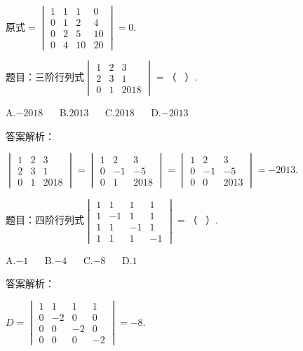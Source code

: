 $\mathrm{原式}=\begin{vmatrix}1&1&1&0\\0&1&2&4\\0&2&5&10\\0&4&10&20\end{vmatrix}=0.$



题目：$\mathrm{三阶行列式}\begin{vmatrix}1&2&3\\2&3&1\\0&1&2018\end{vmatrix}=（\;\;\;）.$

A.$-2018$ $\quad$ B.$2013$ $\quad$ C.$2018$ $\quad$ D.$-2013$

答案解析：

$\begin{vmatrix}1&2&3\\2&3&1\\0&1&2018\end{vmatrix}=\begin{vmatrix}1&2&3\\0&-1&-5\\0&1&2018\end{vmatrix}=\begin{vmatrix}1&2&3\\0&-1&-5\\0&0&2013\end{vmatrix}=-2013.$



题目：$\mathrm{四阶行列式}\begin{vmatrix}1&1&1&1\\1&-1&1&1\\1&1&-1&1\\1&1&1&-1\end{vmatrix}=（\;\;\;）.\;$

A.$-1$ $\quad$ B.$-4$ $\quad$ C.$-8$ $\quad$ D.$1$

答案解析：

$D\overset{}=\begin{vmatrix}1&1&1&1\\0&-2&0&0\\0&0&-2&0\\0&0&0&-2\end{vmatrix}=-8.$
